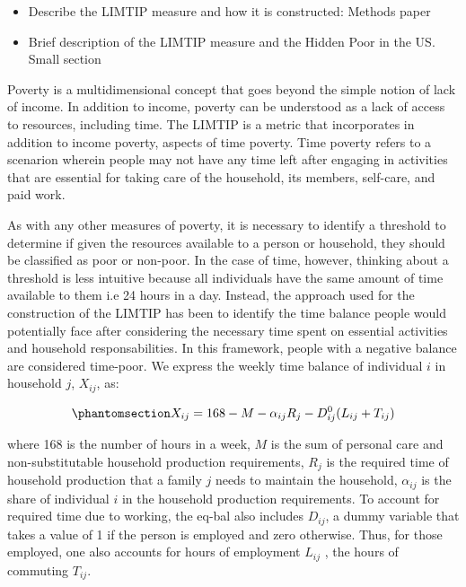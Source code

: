 \documentclass[
  11pt,
]{article}
\providecommand{\tightlist}{%
  \setlength{\itemsep}{0pt}\setlength{\parskip}{0pt}}\usepackage{longtable,booktabs,array}
\begin{document}
\begin{itemize}
\tightlist
\item
  Describe the LIMTIP measure and how it is constructed: Methods paper
\item
  Brief description of the LIMTIP measure and the Hidden Poor in the US.
  Small section
\end{itemize}

Poverty is a multidimensional concept that goes beyond the simple notion
of lack of income. In addition to income, poverty can be understood as a
lack of access to resources, including time. The LIMTIP is a metric that
incorporates in addition to income poverty, aspects of time poverty.
Time poverty refers to a scenarion wherein people may not have any time
left after engaging in activities that are essential for taking care of
the household, its members, self-care, and paid work.

As with any other measures of poverty, it is necessary to identify a
threshold to determine if given the resources available to a person or
household, they should be classified as poor or non-poor. In the case of
time, however, thinking about a threshold is less intuitive because all
individuals have the same amount of time available to them i.e 24 hours
in a day. Instead, the approach used for the construction of the LIMTIP
has been to identify the time balance people would potentially face
after considering the necessary time spent on essential activities and
household responsabilities. In this framework, people with a negative
balance are considered time-poor. We express the weekly time balance of
individual \(i\) in household \(j\), \(X_{ij}\), as:

\begin{equation}\phantomsection\label{eq-bal}{X_{ij} = 168 - M - \alpha_{ij}R_j-D_{ij}^0(L_{ij}+T_{ij})
}\end{equation}

where 168 is the number of hours in a week, \(M\) is the sum of personal
care and non-substitutable household production requirements, \(R_j\) is
the required time of household production that a family \(j\) needs to
maintain the household, \(\alpha_{ij}\) is the share of individual \(i\)
in the household production requirements. To account for required time
due to working, the eq-bal also includes \(D_{ij}\), a dummy variable
that takes a value of 1 if the person is employed and zero otherwise.
Thus, for those employed, one also accounts for hours of employment
\(L_{ij}\) , the hours of commuting \(T_{ij}\).
\end{document}
